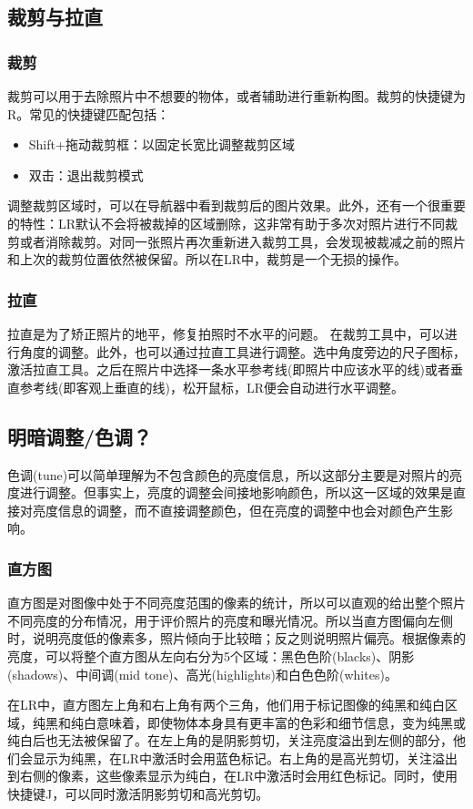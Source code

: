 \documentclass{ctexart}
\begin{document}
\subsection{裁剪与拉直}
\subsubsection{裁剪}
裁剪可以用于去除照片中不想要的物体，或者辅助进行重新构图。裁剪的快捷键为R。常见的快捷键匹配包括：
\begin{itemize}
    \item Shift+拖动裁剪框：以固定长宽比调整裁剪区域
    \item 双击：退出裁剪模式
\end{itemize}
调整裁剪区域时，可以在导航器中看到裁剪后的图片效果。此外，还有一个很重要的特性：LR默认不会将被裁掉的区域删除，这非常有助于多次对照片进行不同裁剪或者消除裁剪。对同一张照片再次重新进入裁剪工具，会发现被裁减之前的照片和上次的裁剪位置依然被保留。所以在LR中，裁剪是一个无损的操作。
\subsubsection{拉直}
拉直是为了矫正照片的地平，修复拍照时不水平的问题。
在裁剪工具中，可以进行角度的调整。此外，也可以通过拉直工具进行调整。选中角度旁边的尺子图标，激活拉直工具。之后在照片中选择一条水平参考线(即照片中应该水平的线)或者垂直参考线(即客观上垂直的线)，松开鼠标，LR便会自动进行水平调整。
\subsection{明暗调整/色调？}
色调(tune)可以简单理解为不包含颜色的亮度信息，所以这部分主要是对照片的亮度进行调整。但事实上，亮度的调整会间接地影响颜色，所以这一区域的效果是直接对亮度信息的调整，而不直接调整颜色，但在亮度的调整中也会对颜色产生影响。
\subsubsection{直方图}
直方图是对图像中处于不同亮度范围的像素的统计，所以可以直观的给出整个照片不同亮度的分布情况，用于评价照片的亮度和曝光情况。所以当直方图偏向左侧时，说明亮度低的像素多，照片倾向于比较暗；反之则说明照片偏亮。根据像素的亮度，可以将整个直方图从左向右分为5个区域：黑色色阶(blacks)、阴影(shadows)、中间调(mid tone)、高光(highlights)和白色色阶(whites)。

在LR中，直方图左上角和右上角有两个三角，他们用于标记图像的纯黑和纯白区域，纯黑和纯白意味着，即使物体本身具有更丰富的色彩和细节信息，变为纯黑或纯白后也无法被保留了。在左上角的是阴影剪切，关注亮度溢出到左侧的部分，他们会显示为纯黑，在LR中激活时会用蓝色标记。右上角的是高光剪切，关注溢出到右侧的像素，这些像素显示为纯白，在LR中激活时会用红色标记。同时，使用快捷键J，可以同时激活阴影剪切和高光剪切。
\end{document}
